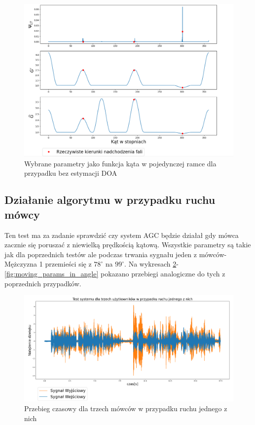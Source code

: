 \begin{figure}[h!]
    \centering
    \includegraphics[width=\textwidth]{Images/multi_user_params_in_angle.png}
    \caption{Wybrane parametry jako funkcja kąta w pojedynczej ramce dla przypadku bez estymacji DOA}
    \label{fig:multi_user_no_doa_params_in_angle}
\end{figure}

\subsection{Działanie algorytmu w przypadku ruchu mówcy}

Ten test ma za zadanie sprawdzić czy system AGC będzie działał gdy mówca zacznie się poruszać z niewielką prędkością kątową. Wszystkie parametry są takie jak dla poprzednich testów ale podczas trwania sygnału jeden z mówców- Mężczyzna 1 przemieści się z $78^{\circ} $ na $ 99^{\circ}$.
Na wykresach \ref{fig:moving}-\ref{fig:moving_params_in_angle} pokazano przebiegi analogiczne do tych z poprzednich przypadków.

\begin{figure}[h!]
    \centering
    \includegraphics[width=\textwidth]{Images/moving.png}
    \caption{Przebieg czasowy dla trzech mówców w przypadku ruchu jednego z nich}
    \label{fig:moving}
\end{figure}

